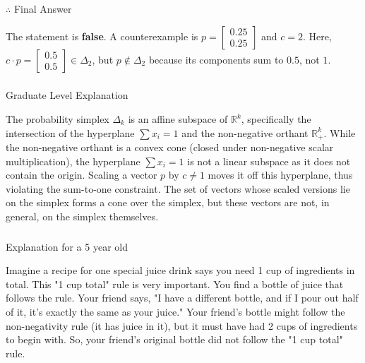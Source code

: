 \documentclass{article}
\begin{document}
\subsubsection*{\normalfont}{$\therefore$ Final Answer}\\
\parbox{\textwidth}{The statement is \textbf{false}. A counterexample is $p = \begin{bmatrix} 0.25 \\ 0.25 \end{bmatrix}$ and $c=2$. Here, $c \cdot p = \begin{bmatrix} 0.5 \\ 0.5 \end{bmatrix} \in \Delta_2$, but $p \notin \Delta_2$ because its components sum to $0.5$, not $1$.}

\subsubsection*{\normalfont}{Graduate Level Explanation}\\
\parbox{\textwidth}{
  The probability simplex $\Delta_k$ is an affine subspace of $\mathbb{R}^k$, specifically the intersection of the hyperplane $\sum x_i = 1$ and the non-negative orthant $\mathbb{R}^k_+$. While the non-negative orthant is a convex cone (closed under non-negative scalar multiplication), the hyperplane $\sum x_i = 1$ is not a linear subspace as it does not contain the origin. Scaling a vector $p$ by $c \neq 1$ moves it off this hyperplane, thus violating the sum-to-one constraint. The set of vectors whose scaled versions lie on the simplex forms a cone over the simplex, but these vectors are not, in general, on the simplex themselves.}

\subsubsection*{\normalfont}{Explanation for a 5 year old}\\
\parbox{\textwidth}{Imagine a recipe for one special juice drink says you need 1 cup of ingredients in total. This "1 cup total" rule is very important. You find a bottle of juice that follows the rule. Your friend says, "I have a different bottle, and if I pour out half of it, it's exactly the same as your juice." Your friend's bottle might follow the non-negativity rule (it has juice in it), but it must have had 2 cups of ingredients to begin with. So, your friend's original bottle did not follow the "1 cup total" rule.}
\end{document}
